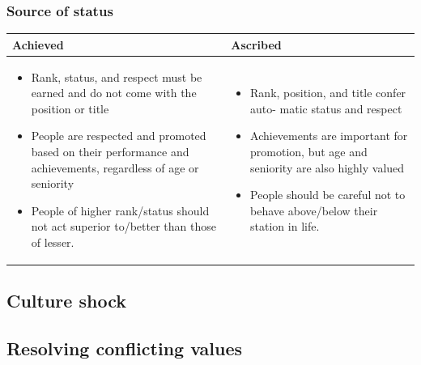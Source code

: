 \subsubsection{Source of status}
\begin{tabularx}{\textwidth}{X|X}
	\textbf{Achieved} & \textbf{Ascribed} \\ 
	\hline 
	\begin{itemize}
		\tightlist
		\item Rank,	status, and respect must be	earned and do not come with the position or title
		\item People are respected and promoted based on their performance
		and achievements, regardless of age or seniority
		\item People of higher rank/status should not act superior to/better than those of lesser.
	\end{itemize}
	&
	\begin{itemize}
		\tightlist
		\item Rank, position, and title confer auto-
		matic status and respect
		\item Achievements are important for promotion, but age and seniority are also highly valued
		\item People should be careful not to behave above/below their station in life.
	\end{itemize} \\
\end{tabularx}

\subsection{Culture shock}

\subsection{Resolving conflicting values}